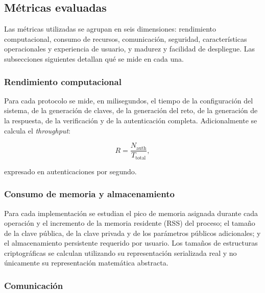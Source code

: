 \subsection{Métricas evaluadas}
\label{sec:metrics}

Las métricas utilizadas se agrupan en seis dimensiones: rendimiento computacional,
consumo de recursos, comunicación, seguridad, características operacionales y
experiencia de usuario, y madurez y facilidad de despliegue. Las subsecciones
siguientes detallan qué se mide en cada una.


\subsubsection{Rendimiento computacional}

Para cada protocolo se mide, en milisegundos, el tiempo de la configuración del sistema,
de la generación de claves, de la generación del reto, de la generación de la respuesta,
de la verificación y de la autenticación completa. Adicionalmente se calcula el
\textit{throughput}:

\begin{equation}
    R =
    \frac{N_{\text{auth}}}
         {T_{\text{total}}},
\end{equation}

expresado en autenticaciones por segundo.


\subsubsection{Consumo de memoria y almacenamiento}

Para cada implementación se estudian el pico de memoria asignada durante cada operación
y el incremento de la memoria residente (RSS) del proceso; el tamaño de la clave pública,
de la clave privada y de los parámetros públicos adicionales; y el almacenamiento
persistente requerido por usuario. Los tamaños de estructuras criptográficas se calculan
utilizando su representación serializada real y no únicamente su representación
matemática abstracta.


\subsubsection{Comunicación}


